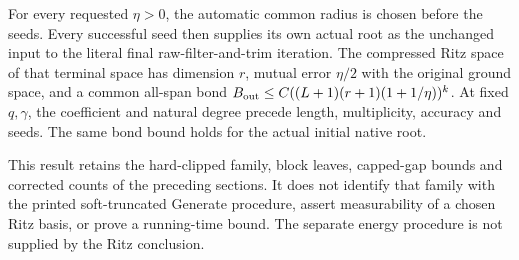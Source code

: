\documentclass{article}
\begin{document}
For every requested $\eta>0$, the automatic common radius is chosen before
the seeds. Every successful seed then supplies its own actual root as the
unchanged input to the literal final raw-filter-and-trim iteration. The
compressed Ritz space of that terminal space has dimension $r$, mutual
error $\eta/2$ with the original ground space, and a common all-span bond
$B_{\rm out}\le C((L+1)(r+1)(1+1/\eta))^k$. At fixed $q,\gamma$, the
coefficient and natural degree precede length, multiplicity, accuracy and
seeds. The same bond bound holds for the actual initial native root.

This result retains the hard-clipped family, block leaves, capped-gap
bounds and corrected counts of the preceding sections. It does not
identify that family with the printed soft-truncated Generate procedure,
assert measurability of a chosen Ritz basis, or prove a running-time bound.
The separate energy procedure is not supplied by the Ritz conclusion.


\end{document}
